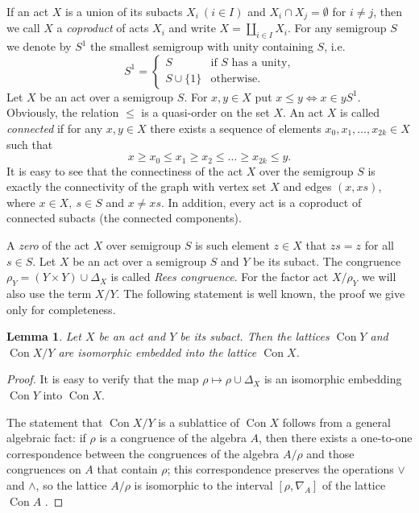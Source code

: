 \documentclass{birkau}
\numberwithin{equation}{section}
\theoremstyle{plain}
\newtheorem{lemma}[theorem]{Lemma}
\theoremstyle{definition}
\DeclareMathOperator{\Con}{Con}
\begin{document}
	If an act $X$ is a union of its subacts $ X_i\ (i \in I) $ and $ X_i \cap X_j = \emptyset $ for $i \neq j$, then we call $X$ a \textit{coproduct} of acts $X_i$ and write $ X = \coprod_{i\in I} X_i $. For any semigroup $S$ we denote by $S^1$ the smallest semigroup with unity containing $S$, i.e.
	$$ S^1 =
		\begin{cases}
			S & \text{if $S$ has a unity,}\\
			S \cup \{1\} & \text{otherwise.}
		\end{cases}
	$$
	Let $X$ be an act over a semigroup $S$. For $ x,y \in X$ put $ x \leqslant y \Leftrightarrow x \in yS^1 $. Obviously, the relation $\leqslant$ is a quasi-order on the set $X$. An act $X$ is called \textit{connected} if for any $x,y\in X$ there exists a sequence of elements $x_0,x_1,\ldots,x_{2k}\in X$ such that $$ x \geqslant x_0 \leqslant x_1 \geqslant x_2 \leqslant \ldots \geqslant x_{2k} \leqslant y. $$ It is easy to see that the connectiness of the act $X$ over the semigroup $S$ is exactly the connectivity of the graph with vertex set $X$ and edges $ (x,xs) $, where $ x \in X,\ s \in S $ and $x \neq xs$. In addition, every act is a coproduct of connected subacts (the connected components).
	
	A \textit{zero} of the act $X$ over semigroup $S$ is such element $z \in X$ that $zs=z$ for all $s \in S$.
	Let $X$ be an act over a semigroup $S$ and $Y$ be its subact. The congruence $\rho_Y = (Y \times Y) \cup \Delta_X$ is called \textit{Rees congruence}. For the factor act ${X}/{\rho_Y}$ we will also use the term $X/Y$. The following statement is well known, the proof we give only for completeness.
	
	\begin{lemma} \label{lemma:01}
	    Let $X$ be an act and $Y$ be its subact. Then the lattices $\Con Y$ and $\Con {X}/{Y}$ are isomorphic embedded into the lattice $\Con X$.
	\end{lemma}
	\begin{proof}
	    It is easy to verify that the map $\rho \mapsto \rho \cup \Delta_X$ is an isomorphic embedding $\Con Y$ into $\Con X$.
		
	The statement that $\Con {X}/{Y}$ is a sublattice of $\Con X$ follows from a general algebraic fact: if $\rho$ is a congruence of the algebra $A$, then there exists a one-to-one correspondence between the congruences of the algebra ${A}/{\rho}$ and those congruences on $A$ that contain $\rho$; this correspondence preserves the operations $\vee$ and $\wedge$, so the lattice ${A}/{\rho}$ is isomorphic to the interval $[\rho, \nabla_A]$ of the lattice $\Con A$ \cite[Theorem 6.20]{burris}.
    \end{proof}
	
\end{document}
